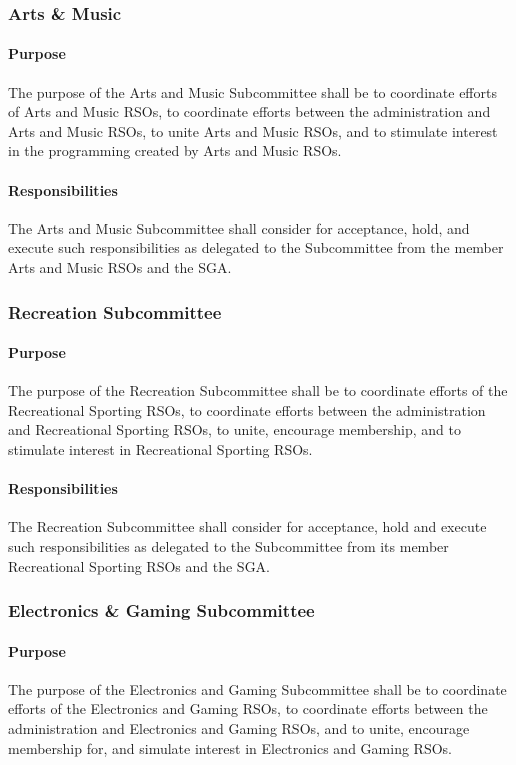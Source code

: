 \documentclass[12pt]{scrreprt}
\begin{document}
\subsubsection{Arts \& Music}

\paragraph{Purpose}
The purpose of the Arts and Music Subcommittee shall be to coordinate efforts
of Arts and Music RSOs, to coordinate efforts between the administration and Arts and
Music RSOs, to unite Arts and Music RSOs, and to stimulate interest in the programming
created by Arts and Music RSOs.

\paragraph{Responsibilities}
The Arts and Music Subcommittee shall consider for acceptance, hold,
and execute such responsibilities as delegated to the Subcommittee from the member Arts
and Music RSOs and the SGA.

\subsubsection{Recreation Subcommittee}

\paragraph{Purpose}
The purpose of the Recreation Subcommittee shall be to coordinate efforts of
the Recreational Sporting RSOs, to coordinate efforts between the administration and
Recreational Sporting RSOs, to unite, encourage membership, and to stimulate interest in
Recreational Sporting RSOs.

\paragraph{Responsibilities}
The Recreation Subcommittee shall consider for acceptance, hold and
execute such responsibilities as delegated to the Subcommittee from its member
Recreational Sporting RSOs and the SGA.

\subsubsection{Electronics \& Gaming Subcommittee}
\paragraph{Purpose}
The purpose of the Electronics and Gaming Subcommittee shall be to
coordinate efforts of the Electronics and Gaming RSOs, to coordinate efforts between the
administration and Electronics and Gaming RSOs, and to unite, encourage membership for,
and simulate interest in Electronics and Gaming RSOs.
\end{document}

